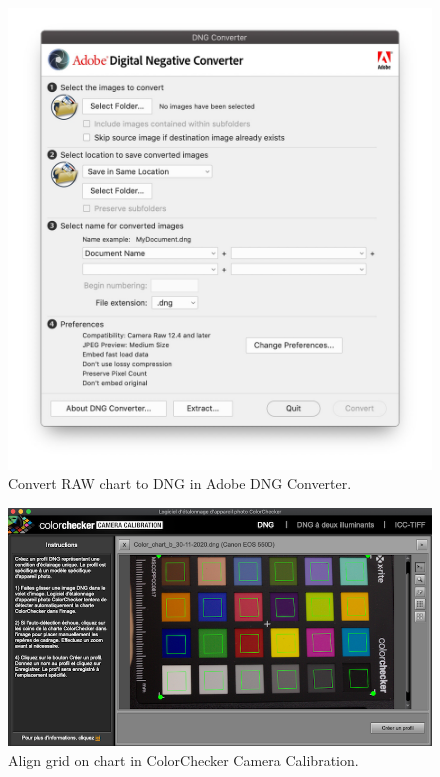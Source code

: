 \documentclass[
]{book}
\begin{document}
\begin{figure}

{\centering \includegraphics[width=0.8\linewidth]{Figures/DNGConverter} 

}

\caption{Convert RAW chart to DNG in Adobe DNG Converter.}\label{fig:DNG}
\end{figure}

\begin{figure}

{\centering \includegraphics[width=0.8\linewidth]{Figures/ColorChecker_camera_calibration} 

}

\caption{Align grid on chart in ColorChecker Camera Calibration.}\label{fig:Colorcheckercalibration}
\end{figure}
\end{document}
